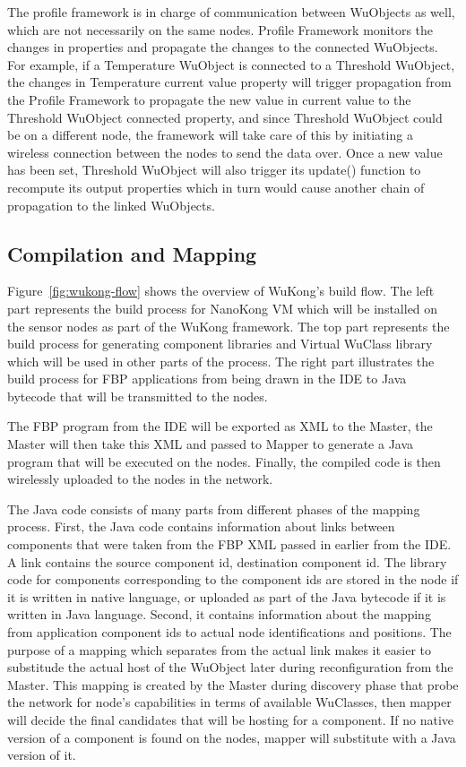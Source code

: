 The profile framework is in charge of communication between WuObjects as
well, which are not necessarily on the same nodes. Profile Framework monitors
the changes in properties and propagate the changes to the connected WuObjects.
For example, if a Temperature WuObject is connected to a Threshold WuObject,
the changes in Temperature current value property will trigger propagation from
the Profile Framework to propagate the new value in current value to the
Threshold WuObject connected property, and since Threshold WuObject could be on
a different node, the framework will take care of this by initiating
a wireless connection between the nodes to send the data over. Once a new value
has been set, Threshold WuObject will also trigger its update() function to
recompute its output properties which in turn would cause another chain of
propagation to the linked WuObjects.

\subsection{Compilation and Mapping}

Figure~\ref{fig:wukong-flow} shows the overview of WuKong's build flow. The
left part represents the build process for NanoKong VM which will be installed
on the sensor nodes as part of the WuKong framework. The top part represents
the build process for generating component libraries and Virtual WuClass
library which will be used in other parts of the process. The right part
illustrates the build process for FBP applications from being drawn in the IDE
to Java bytecode that will be transmitted to the nodes.

The FBP program from the IDE will be exported as XML to the Master, the Master
will then take this XML and passed to Mapper to generate a Java program that
will be executed on the nodes. Finally, the compiled code is then wirelessly
uploaded to the nodes in the network.

The Java code consists of many parts from different phases of the mapping process.
First, the Java code contains information about links between components that
were taken from the FBP XML passed in earlier from the IDE. A link contains the
source component id, destination component id. The library code for components
corresponding to the component ids are stored in the node if it is written in
native language, or uploaded as part of the Java bytecode if it is written in
Java language. Second, it contains information about the mapping from
application component ids to actual node identifications and positions. The
purpose of a mapping which separates from the actual link makes it easier to
substitude the actual host of the WuObject later during
reconfiguration from the Master. This mapping is created by the Master during
discovery phase that probe the network for node's capabilities in terms of
available WuClasses, then mapper will decide the final candidates that will be
hosting for a component. If no native version of a component is found on the
nodes, mapper will substitute with a Java version of it.

